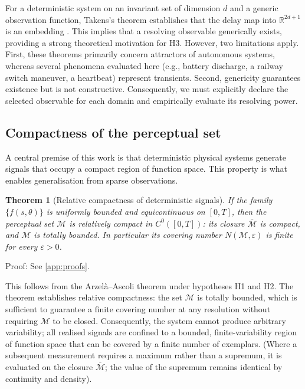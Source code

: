 \documentclass[10pt]{article}
\theoremstyle{plain}
\newtheorem{theorem}{Theorem}[section]
\theoremstyle{definition}
\theoremstyle{remark}
\begin{document}
For a deterministic system on an invariant set of dimension $d$ and a generic
observation function, Takens's theorem establishes that the delay map into
$\mathbb{R}^{2d+1}$ is an embedding \citep{takens1981detecting, sauer1991embedology}.
This implies that a resolving observable generically exists, providing a strong
theoretical motivation for H3. However, two limitations apply. First, these
theorems primarily concern attractors of autonomous systems, whereas several
phenomena evaluated here (e.g., battery discharge, a railway switch maneuver, a
heartbeat) represent transients. Second, genericity guarantees existence but is
not constructive. Consequently, we must explicitly declare the selected observable
for each domain and empirically evaluate its resolving power.

\subsection{Compactness of the perceptual set}

A central premise of this work is that deterministic physical systems generate
signals that occupy a compact region of function space. This property is what
enables generalisation from sparse observations.

\begin{theorem}[Relative compactness of deterministic signals]
\label{thm:compactness}
If the family $\{f(s,\theta)\}$ is uniformly bounded and equicontinuous on
$[0,T]$, then the perceptual set $\mathcal{M}$ is \emph{relatively compact} in
$C^0([0,T])$: its closure $\overline{\mathcal{M}}$ is compact, and
$\mathcal{M}$ is totally bounded. In particular its covering number
$N(\mathcal{M},\varepsilon)$ is finite for every $\varepsilon > 0$.
\end{theorem}

\noindent Proof: See \ref{app:proofs}.

This follows from the Arzel\`a--Ascoli theorem \citep{royden2010real,
rudin1991functional, conway1990course} under hypotheses H1 and H2. The theorem
establishes relative compactness: the set $\mathcal{M}$ is totally bounded,
which is sufficient to guarantee a finite covering number at any resolution
without requiring $\mathcal{M}$ to be closed. Consequently, the system cannot
produce arbitrary variability; all realised signals are confined to a bounded,
finite-variability region of function space that can be covered by a finite
number of exemplars. (Where a subsequent measurement requires a maximum rather
than a supremum, it is evaluated on the closure $\overline{\mathcal{M}}$; the
value of the supremum remains identical by continuity and density).
\end{document}
